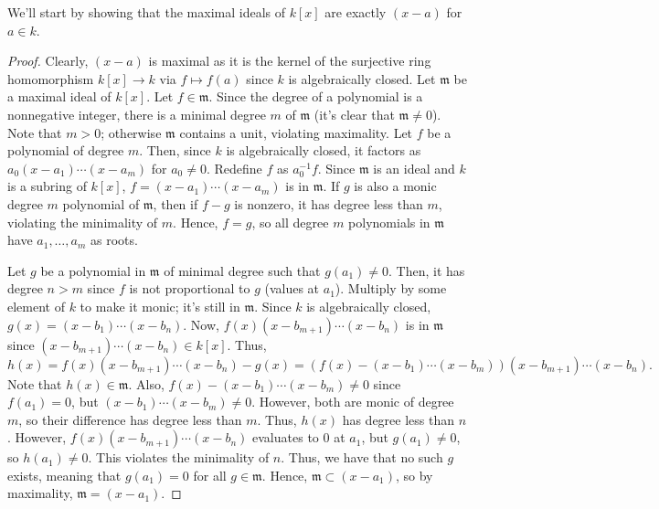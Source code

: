 We'll start by showing that the maximal ideals of $k[x]$ are exactly $(x - a)$ for $a \in k$.
\begin{proof}
Clearly, $(x - a)$ is maximal as it is the kernel of the surjective ring homomorphism $k[x] \to k$ via $f \mapsto f(a)$ since $k$ is algebraically closed. Let $\mathfrak{m}$ be a maximal ideal of $k[x]$. Let
$f \in \mathfrak{m}$. Since the degree of a polynomial is a nonnegative integer, there is a minimal degree $m$ of $\mathfrak{m}$ (it's clear that $\mathfrak{m} \neq 0$). Note that $m > 0$; otherwise $\mathfrak{m}$ contains a unit,
violating maximality. Let $f$ be a polynomial of degree $m$. Then, since $k$ is algebraically closed, it factors as $a_0(x-a_1)\cdots(x-a_m)$ for $a_0 \neq 0$. Redefine $f$ as $a_0^{-1}f$. Since $\mathfrak{m}$ is an ideal 
and $k$ is a subring of $k[x]$, $f = (x-a_1)\cdots(x-a_m)$ is in $\mathfrak{m}$. If $g$ is also a monic degree $m$ polynomial of $\mathfrak{m}$, then if $f-g$ is nonzero, it has degree less than $m$, violating the minimality
of $m$. Hence, $f = g$, so all degree $m$ polynomials in $\mathfrak{m}$ have $a_1,\ldots,a_m$ as roots.

Let $g$ be a polynomial in $\mathfrak{m}$ of minimal degree such that $g(a_1) \neq 0$. Then, it has degree $n > m$ since $f$ is not proportional to $g$ (values at $a_1$). Multiply by some element of $k$ to make it monic; 
it's still in $\mathfrak{m}$. Since $k$ is algebraically closed, $g(x) = (x-b_1)\cdots(x-b_n)$. Now, $f(x)(x-b_{m+1})\cdots(x-b_n)$ is in $\mathfrak{m}$ since $(x-b_{m+1})\cdots(x-b_n) \in k[x]$. Thus,
$$h(x) = f(x)(x-b_{m+1})\cdots(x-b_n) - g(x) = (f(x) - (x-b_1)\cdots(x-b_m))(x-b_{m+1})\cdots(x-b_n).$$
Note that $h(x) \in \mathfrak{m}$. Also, $f(x) - (x-b_1)\cdots(x-b_m) \neq 0$ since $f(a_1) = 0$, but $(x-b_1)\cdots(x-b_m) \neq 0$. However, both are monic of degree $m$, so their difference has
degree less than $m$. Thus, $h(x)$ has degree less than $n$. However, $f(x)(x-b_{m+1})\cdots(x-b_n)$ evaluates to $0$ at $a_1$, but $g(a_1)\neq 0$, so $h(a_1)\neq 0$. This violates the minimality of $n$. Thus,
we have that no such $g$ exists, meaning that $g(a_1) = 0$ for all $g \in \mathfrak{m}$. Hence, $\mathfrak{m} \subset (x - a_1)$, so by maximality, $\mathfrak{m} = (x-a_1)$.
\end{proof}

